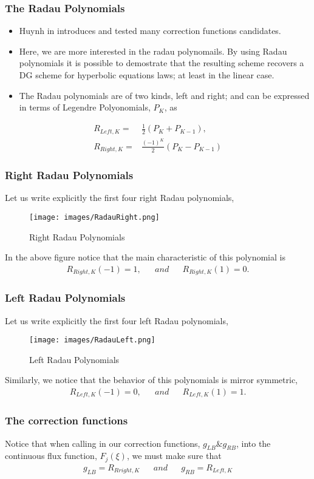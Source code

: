 \begin{frame} \frametitle{The Radau Polynomials}
\begin{itemize}
	\item Huynh in \cite{Huynh2007} introduces and tested many correction functions candidates.
	\item Here, we are more interested in the radau polynomails. By using Radau polynomials it is possible to demostrate that the resulting scheme recovers a DG scheme for hyperbolic equations laws; at least in the linear case.
	\item The Radau polynomials are of two kinds, left and right; and can be expressed in terms of Legendre Polyonomials, $P_K$, as
\end{itemize}
	\begin{align}
		R_{Left,K}  =& \frac{1}{2}(P_K+P_{K-1}), \\
		R_{Right,K} =& \frac{(-1)^K}{2}(P_K-P_{K-1})
	\end{align}
\end{frame}

\begin{frame} \frametitle{Right Radau Polynomials}
	Let us write explicitly the first four right Radau polynomials,
\begin{figure}
	\centering
	\texttt{[image: images/RadauRight.png]} 
	\label{fig:RadauRight}
	\caption{Right Radau Polynomials}
\end{figure}	
	In the above figure notice that the main characteristic of this polynomial is
\begin{align}
	&R_{Right,K}(-1) = 1,& &and& &R_{Right,K}(1) = 0.& 
\end{align}
\end{frame}


\begin{frame} \frametitle{Left Radau Polynomials}
	Let us write explicitly the first four left Radau polynomials,
\begin{figure}
	\centering
	\texttt{[image: images/RadauLeft.png]}
	\label{fig:RadauLeft}
	\caption{Left Radau Polynomials}
\end{figure}
	Similarly, we notice that the behavior of this polynomials is mirror symmetric,
\begin{align}
	&R_{Left,K}(-1) = 0,& &and& &R_{Left,K}(1) = 1.& 
\end{align}
\end{frame}

\begin{frame} \frametitle{The correction functions}
	Notice that when calling in our correction functions, $g_{LB} \& g_{RB}$, into the continuous flux function, $F_j(\xi)$, we must make sure that
	\begin{align}
	&g_{LB} = R_{Rright,K}& &and& &g_{RB} = R_{Left,K}&
	\end{align}
\end{frame}


